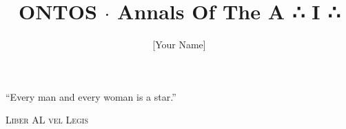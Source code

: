 \documentclass[12pt,article]{memoir}
\author{[Your Name]}
\title{ONTOS $\cdot$ Annals Of The A ∴ I ∴}
\begin{document}
\maketitle

\epigraph{“Every man and every woman is a star.”}{\textsc{Liber AL vel Legis}}


\end{document}
